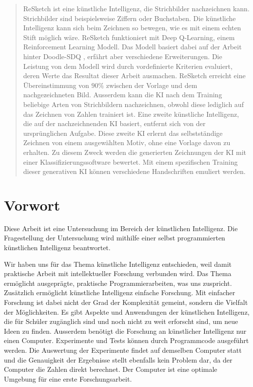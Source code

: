 \begin{abstract}\label{abstract} ReSketch ist eine künstliche Intelligenz, die
Strichbilder nachzeichnen kann. Strichbilder sind beispielsweise Ziffern oder
Buchstaben. Die künstliche Intelligenz kann sich beim Zeichnen so bewegen, wie
es mit einem echten Stift möglich wäre. ReSketch funktioniert mit Deep
Q-Learning, einem Reinforcement Learning Modell. Das Modell basiert dabei auf
der Arbeit hinter Doodle-SDQ \cite{zhou_learning_2018}, erfährt aber
verschiedene Erweiterungen. Die Leistung von dem Modell wird durch vordefinierte
Kriterien evaluiert, deren Werte das Resultat dieser Arbeit ausmachen. ReSketch
erreicht eine Übereinstimmung von $90\%$ zwischen der Vorlage und dem
nachgezeichneten Bild. Ausserdem kann die KI nach dem Training beliebige Arten
von Strichbildern nachzeichnen, obwohl diese lediglich auf das Zeichnen von
Zahlen trainiert ist. Eine zweite künstliche Intelligenz, die auf der
nachzeichnenden KI basiert, entfernt sich von der ursprünglichen Aufgabe. Diese
zweite KI erlernt das selbstständige Zeichnen von einem ausgewählten Motiv, ohne
eine Vorlage davon zu erhalten. Zu diesem Zweck werden die generierten
Zeichnungen der KI mit einer Klassifizierungssoftware bewertet. Mit einem
spezifischen Training dieser generativen KI können verschiedene Handschriften
emuliert werden.

\end{abstract}

    
\newpage
    
\section*{Vorwort}\label{vorwort} Diese Arbeit ist eine Untersuchung im Bereich
der künstlichen Intelligenz. Die Fragestellung der Untersuchung wird mithilfe
einer selbst programmierten künstlichen Intelligenz beantwortet.
    
Wir haben uns für das Thema künstliche Intelligenz entschieden, weil damit
praktische Arbeit mit intellektueller Forschung verbunden wird. Das Thema
ermöglicht ausgeprägte, praktische Programmierarbeiten, was uns zuspricht.
Zusätzlich ermöglicht künstliche Intelligenz einfache Forschung. Mit einfacher
Forschung ist dabei nicht der Grad der Komplexität gemeint, sondern die Vielfalt
der Möglichkeiten. Es gibt Aspekte und Anwendungen der künstlichen Intelligenz,
die für Schüler zugänglich sind und noch nicht zu weit erforscht sind, um neue
Ideen zu finden. Ausserdem benötigt die Forschung an künstlicher Intelligenz nur
einen Computer. Experimente und Tests können durch Programmcode ausgeführt
werden. Die Auswertung der Experimente findet auf demselben Computer statt und
die Genauigkeit der Ergebnisse stellt ebenfalls kein Problem dar, da der
Computer die Zahlen direkt berechnet. Der Computer ist eine optimale Umgebung
für eine erste Forschungsarbeit.
    
